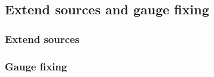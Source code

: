 \subsection{\label{Extend sources}Extend sources and gauge fixing}

\subsubsection{\label{Extend sources_sub}Extend sources}

\subsubsection{\label{Gauge_fixing}Gauge fixing}